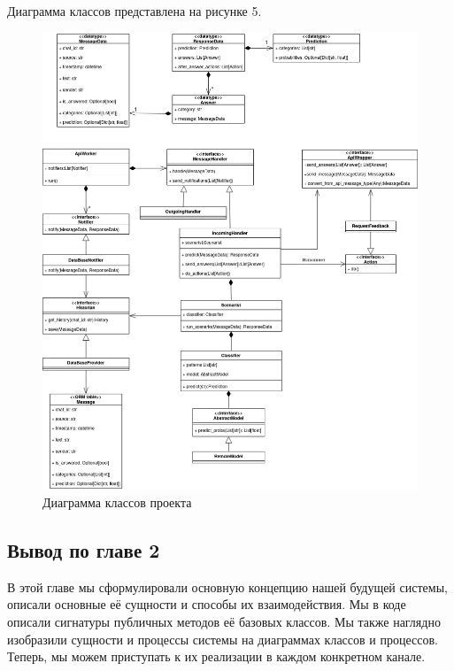    Диаграмма классов представлена на рисунке 5.

    \begin{figure}[H]
        \centering
        \includegraphics[width=\linewidth]{static/ClassDiagram.png}
        \caption{Диаграмма классов проекта}
        \label{fig:class-diagram}
    \end{figure}


    \subsection*{Вывод по главе 2}
    В этой главе мы сформулировали основную концепцию нашей будущей системы, 
    описали основные её сущности и способы их взаимодействия. Мы в коде описали 
    сигнатуры публичных методов её базовых классов.
    Мы также наглядно изобразили сущности и процессы системы на диаграммах классов
    и процессов.
    Теперь, мы можем приступать к их реализации в каждом конкретном канале.
